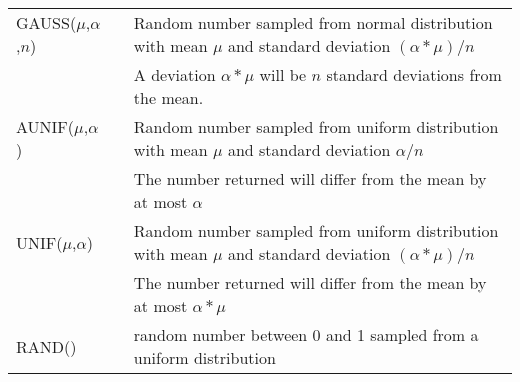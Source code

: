 {\begin{longtable}{>{\raggedright\small}m{1in}>{\raggedright\small}m{2in}>{\raggedright\let\\\tabularnewline\small}m{2in}}
    GAUSS($\mu$,$\alpha$,$n$) &  & Random number sampled from normal distribution with mean $\mu$ and standard deviation $(\alpha*\mu)/n$ \\ 
    & & A deviation $\alpha*\mu$ will be $n$ standard deviations from the mean.\footnotemark[1]  \\\hline 


    AUNIF($\mu$,$\alpha$) &  & Random number sampled from uniform distribution with mean $\mu$ and standard deviation $\alpha/n$ \\ 
    & & The number returned will differ from the mean by at most $\alpha$ \footnotemark[1]  \\\hline 

    UNIF($\mu$,$\alpha$) &  & Random number sampled from uniform distribution with mean $\mu$ and standard deviation $(\alpha*\mu)/n$ \\ 
    & & The number returned will differ from the mean by at most $\alpha*\mu$ \footnotemark[1]  \\\hline 

    RAND() & & random number between 0 and 1 sampled from a uniform distribution\footnotemark[1] \\ \hline


\end{longtable}}
